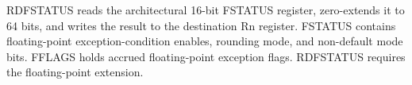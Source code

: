 RDFSTATUS reads the architectural 16-bit FSTATUS register, zero-extends it to 64 bits, and writes the result to the destination Rn register. FSTATUS contains floating-point exception-condition enables, rounding mode, and non-default mode bits. FFLAGS holds accrued floating-point exception flags. RDFSTATUS requires the floating-point extension.
